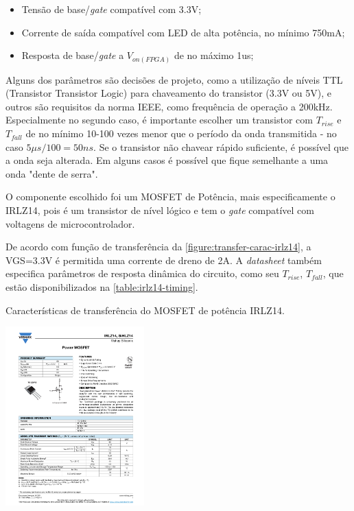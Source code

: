 	\begin{itemize}
		\item Tensão de base/\textit{gate} compatível com 3.3V;
		\item Corrente de saída compatível com LED de alta potência, no mínimo 750mA;
		\item Resposta de base/\textit{gate} a $V_{on(FPGA)}$ de no máximo 1us;
	\end{itemize}

	Alguns dos parâmetros são decisões de projeto, como a utilização de níveis TTL (Transistor Transistor Logic) para chaveamento do transistor (3.3V ou 5V), e outros são requisitos da norma IEEE, como frequência de operação a 200kHz. Especialmente no segundo caso, é importante escolher um transistor com $T_{rise}$ e $T_{fall}$ de no mínimo 10-100 vezes menor que o período da onda transmitida - no caso $5\mu$$s/100 = 50ns$. Se o transistor não chavear rápido suficiente, é possível que a onda seja alterada. Em alguns casos é possível que fique semelhante a uma onda "dente de serra".

	O componente escolhido foi um MOSFET de Potência, mais especificamente o IRLZ14, pois é um transistor de nível lógico e tem o \textit{gate} compatível com voltagens de microcontrolador.

	De acordo com função de transferência da \autoref{figure:transfer-carac-irlz14}, a VGS=3.3V é permitida uma corrente de dreno de 2A. A \textit{datasheet} também especifica parâmetros de resposta dinâmica do circuito, como seu $T_{rise}$, $T_{fall}$, que estão disponibilizados na \autoref{table:irlz14-timing}.

	\begin{chart}[h]
		\caption{\label{figure:transfer-carac-irlz14}Características de transferência do MOSFET de potência IRLZ14.}
		\centering
		\includegraphics[page=3, width=0.4\textwidth, trim={12cm 16.5cm 2.2cm 5cm}, clip]{circuits/irlz14.pdf}
	\end{chart}

